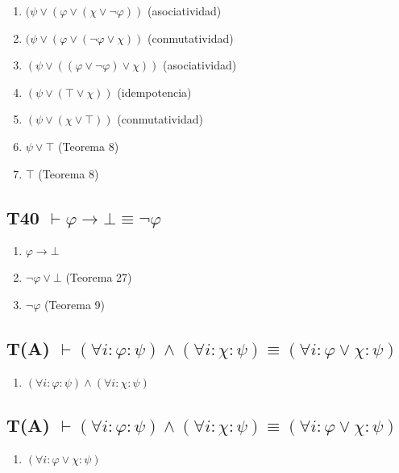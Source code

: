 \begin{enumerate}
    \item $(\psi \lor (\varphi \lor (\chi \lor \neg\varphi)) $ \hfill (asociatividad)
    \item $(\psi \lor (\varphi \lor (\neg\varphi \lor \chi)) $ \hfill (conmutatividad)
    \item $(\psi \lor ((\varphi \lor \neg\varphi) \lor \chi)) $ \hfill (asociatividad)
    \item $(\psi \lor (\top \lor \chi)) $ \hfill (idempotencia)
    \item $(\psi \lor (\chi \lor \top)) $ \hfill (conmutatividad)
    \item $\psi \lor \top $ \hfill (Teorema 8)
    \item $\top$ \hfill (Teorema 8)

\end{enumerate}

\subsection{T40 $\vdash \varphi \rightarrow \bot \equiv \neg\varphi$}

\begin{enumerate}
    \item $\varphi \rightarrow \bot$
    \item $\neg\varphi \lor \bot$ \hfill (Teorema 27)
    \item $\neg\varphi$ \hfill (Teorema 9)
\end{enumerate}

\subsection{T(A) $\vdash (\forall i : \varphi : \psi) \land (\forall i : \chi : \psi) \equiv (\forall i : \varphi \lor \chi : \psi)$}

\begin{enumerate}
    \item $(\forall i : \varphi : \psi) \land (\forall i : \chi : \psi)$
\end{enumerate}


\subsection{T(A) $\vdash (\forall i : \varphi : \psi) \land (\forall i : \chi : \psi) \equiv (\forall i : \varphi \lor \chi : \psi)$}

\begin{enumerate}
    \item $(\forall i : \varphi \lor \chi : \psi)$

\end{enumerate}


